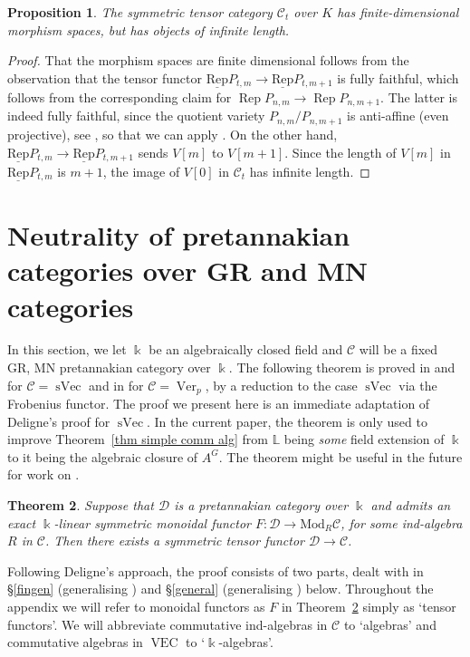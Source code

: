 \documentclass[11pt]{amsart}
\def\Cs{\mathscr{C}}
\def\Ds{\mathscr{D}}
\def\cC{\mathscr{C}}
\def\bk{\Bbbk}
\def\Rep{\operatorname{Rep}}
\def\VEC{\operatorname{VEC}}
\def\sVec{\operatorname{sVec}}
\def\Ver{\operatorname{Ver}}
\def\Mod{\mathrm{Mod}}
\def\uRep{\underline{\mathrm{Rep}}}
\newtheorem{thm}{Theorem}[section]
\newtheorem{prop}[thm]{Proposition}
\theoremstyle{definition}
\theoremstyle{remark}
\numberwithin{equation}{section}
\begin{document}
\begin{prop}
    The symmetric tensor category $\cC_t$ over $K$ has finite-dimensional morphism spaces, but has objects of infinite length.
\end{prop}
\begin{proof}
    That the morphism spaces are finite dimensional follows from the observation that the tensor functor $\uRep P_{t,m}\to\uRep P_{t,m+1}$ is fully faithful, which follows from the corresponding claim for $\Rep P_{n,m}\to\Rep P_{n,m+1}$. The latter is indeed fully faithful, since the quotient variety $P_{n,m}/P_{n,m+1}$ is anti-affine (even projective), see \cite[Sec.~21.3]{Hum}, so that we can apply \cite[Theorem~4.14]{CEOP}.
    On the other hand, $\uRep P_{t,m}\to \uRep P_{t,m+1}$ sends $V[m]$ to $V[m+1]$. Since the length of $V[m]$ in $\uRep P_{t,m}$ is $m+1$, the image of $V[0]$ in $\cC_t$ has infinite length.
\end{proof}


\section{Neutrality of pretannakian categories over GR and MN categories}\label{app:Del}

In this section, we let $\bk$ be an algebraically closed field and $\Cs$ will be a fixed GR, MN pretannakian category over $\bk$. The following theorem is proved in \cite{Del02} and \cite{Duke} for $\cC=\sVec$ and in \cite{CEO-A} for $\cC=\Ver_p$, by a reduction to the case $\sVec$ via the Frobenius functor. The proof we present here is an immediate adaptation  of Deligne's proof for $\sVec$. In the current paper, the theorem is only used to improve Theorem~\ref{thm simple comm alg} from $\mathbb{L}$ being {\em some} field extension of $\bk$ to it being the algebraic closure of $A^G$. The theorem might be useful in the future for work on \cite[Conjecture~1.4]{BEO}.



\begin{thm}\label{thm neutrality}
    Suppose that $\Ds$ is a pretannakian category over $\bk$ and admits an exact $\bk$-linear symmetric monoidal functor $F:\Ds\to \Mod_R\Cs$, for some ind-algebra $R$ in $\Cs$.  Then there exists a symmetric tensor functor $\Ds\to\Cs$.
\end{thm}

Following Deligne's approach, the proof consists of two parts, dealt with in \S \ref{fingen} (generalising \cite[\S 4]{Del02}) and \S\ref{general} (generalising \cite[\S 6.4]{Duke}) below. Throughout the appendix we will refer to monoidal functors as $F$ in Theorem~\ref{thm neutrality} simply as `tensor functors'. We will abbreviate commutative ind-algebras in $\cC$ to `algebras' and commutative algebras in $\VEC$ to `$\bk$-algebras'.
\end{document}
